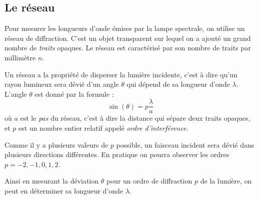 \documentclass{tp}
\begin{document}
\subsection{Le réseau}
\begin{minipage}{0.4\linewidth}

\end{minipage}
\begin{minipage}{0.6\linewidth}
Pour mesurer les longueurs d'onde émises par la lampe spectrale, on utilise un réseau de diffraction. C'est un objet transparent sur lequel on a ajouté un grand nombre de \textit{traits} opaques. Le réseau est caractérisé par son nombre de traits par millimètre $n$.
\end{minipage}
Un réseau a la propriété de disperser la lumière incidente, c'est à dire qu'un rayon lumineux sera dévié d'un angle $\theta$ qui dépend de sa longueur d'onde $\lambda$. L'angle $\theta$ est donné par la formule :
\begin{equation*}
	\sin(\theta) = p\dfrac{\lambda}{a}
\end{equation*}
où $a$ est le \textit{pas} du réseau, c'est à dire la distance qui sépare deux traits opaques, et $p$ est un nombre entier relatif appelé \emph{ordre d'interférence}. 

Comme il y a plusieurs valeurs de $p$ possible, un faisceau incident sera dévié dans plusieurs directions différentes. En pratique on pourra observer les ordres $p=-2, -1, 0, 1, 2$.

Ainsi en mesurant la déviation $\theta$ pour un ordre de diffraction $p$ de la lumière, on peut en déterminer sa longueur d'onde $\lambda$.  
\end{document}
